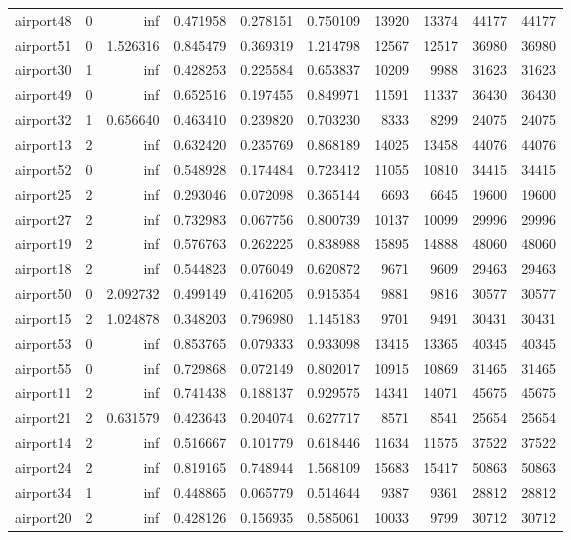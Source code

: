 \begin{longtable}{|l|r|r|r|r|r|r|r|r|r|}
airport48 & 0 & inf & 0.471958 & 0.278151 & 0.750109 & 13920 & 13374 & 44177 & 44177 \\
airport51 & 0 & 1.526316 & 0.845479 & 0.369319 & 1.214798 & 12567 & 12517 & 36980 & 36980 \\
airport30 & 1 & inf & 0.428253 & 0.225584 & 0.653837 & 10209 & 9988 & 31623 & 31623 \\
airport49 & 0 & inf & 0.652516 & 0.197455 & 0.849971 & 11591 & 11337 & 36430 & 36430 \\
airport32 & 1 & 0.656640 & 0.463410 & 0.239820 & 0.703230 & 8333 & 8299 & 24075 & 24075 \\
airport13 & 2 & inf & 0.632420 & 0.235769 & 0.868189 & 14025 & 13458 & 44076 & 44076 \\
airport52 & 0 & inf & 0.548928 & 0.174484 & 0.723412 & 11055 & 10810 & 34415 & 34415 \\
airport25 & 2 & inf & 0.293046 & 0.072098 & 0.365144 & 6693 & 6645 & 19600 & 19600 \\
airport27 & 2 & inf & 0.732983 & 0.067756 & 0.800739 & 10137 & 10099 & 29996 & 29996 \\
airport19 & 2 & inf & 0.576763 & 0.262225 & 0.838988 & 15895 & 14888 & 48060 & 48060 \\
airport18 & 2 & inf & 0.544823 & 0.076049 & 0.620872 & 9671 & 9609 & 29463 & 29463 \\
airport50 & 0 & 2.092732 & 0.499149 & 0.416205 & 0.915354 & 9881 & 9816 & 30577 & 30577 \\
airport15 & 2 & 1.024878 & 0.348203 & 0.796980 & 1.145183 & 9701 & 9491 & 30431 & 30431 \\
airport53 & 0 & inf & 0.853765 & 0.079333 & 0.933098 & 13415 & 13365 & 40345 & 40345 \\
airport55 & 0 & inf & 0.729868 & 0.072149 & 0.802017 & 10915 & 10869 & 31465 & 31465 \\
airport11 & 2 & inf & 0.741438 & 0.188137 & 0.929575 & 14341 & 14071 & 45675 & 45675 \\
airport21 & 2 & 0.631579 & 0.423643 & 0.204074 & 0.627717 & 8571 & 8541 & 25654 & 25654 \\
airport14 & 2 & inf & 0.516667 & 0.101779 & 0.618446 & 11634 & 11575 & 37522 & 37522 \\
airport24 & 2 & inf & 0.819165 & 0.748944 & 1.568109 & 15683 & 15417 & 50863 & 50863 \\
airport34 & 1 & inf & 0.448865 & 0.065779 & 0.514644 & 9387 & 9361 & 28812 & 28812 \\
airport20 & 2 & inf & 0.428126 & 0.156935 & 0.585061 & 10033 & 9799 & 30712 & 30712 \\

\end{longtable}
